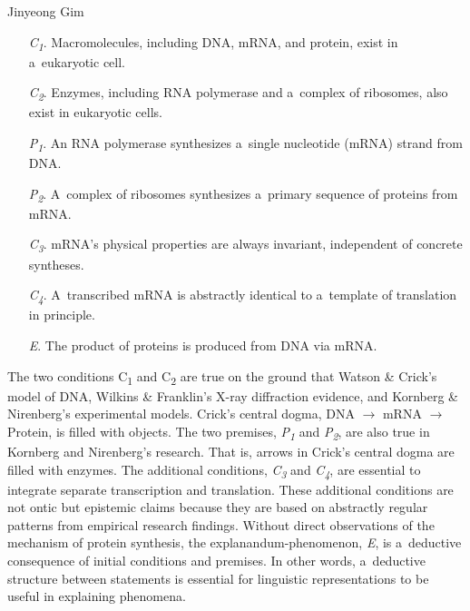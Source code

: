 \begin{artengenv}{Jinyeong Gim}
\begin{itemize}
    \item[\textit{C}\textit{\textsubscript{1}}.] Macromolecules, including DNA, mRNA, and protein, exist in a~eukaryotic cell.
    \item[\textit{C}\textit{\textsubscript{2}}.] Enzymes, including RNA polymerase and a~complex of ribosomes, also exist in eukaryotic cells.
    \item[\textit{P}\textit{\textsubscript{1}}.] An RNA polymerase synthesizes a~single nucleotide (mRNA) strand from DNA.
    \item[\textit{P}\textit{\textsubscript{2}}.] A~complex of ribosomes synthesizes a~primary sequence of proteins from mRNA.
    \item[\textit{C}\textit{\textsubscript{3}}.] mRNA's physical properties are always invariant, independent of concrete syntheses.
    \item[\textit{C}\textit{\textsubscript{4}}.] A~transcribed mRNA is abstractly identical to a~template of translation in principle.
    \item[\textit{E}.] The product of proteins is produced from DNA via mRNA.
\end{itemize}


The two conditions C\textsubscript{1} and C\textsubscript{2} are true on the ground that Watson \& Crick's model of DNA, Wilkins \& Franklin's X-ray diffraction evidence, and Kornberg \& Nirenberg's experimental models. Crick's central dogma, DNA $\to$ mRNA $\to$ Protein, is filled with objects. The two premises, \textit{P}\textit{\textsubscript{1}} and \textit{P}\textit{\textsubscript{2}}, are also true in Kornberg and Nirenberg's research. That is, arrows in Crick's central dogma are filled with enzymes. The additional conditions, \textit{C}\textit{\textsubscript{3}} and \textit{C}\textit{\textsubscript{4}}, are essential to integrate separate transcription and translation. These additional conditions are not ontic but epistemic claims because they are based on abstractly regular patterns from empirical research findings. Without direct observations of the mechanism of protein synthesis, the explanandum-phenomenon, \textit{E}, is a~deductive consequence of initial conditions and premises. In other words, a~deductive structure between statements is essential for linguistic representations to be useful in explaining phenomena.


\end{artengenv}
